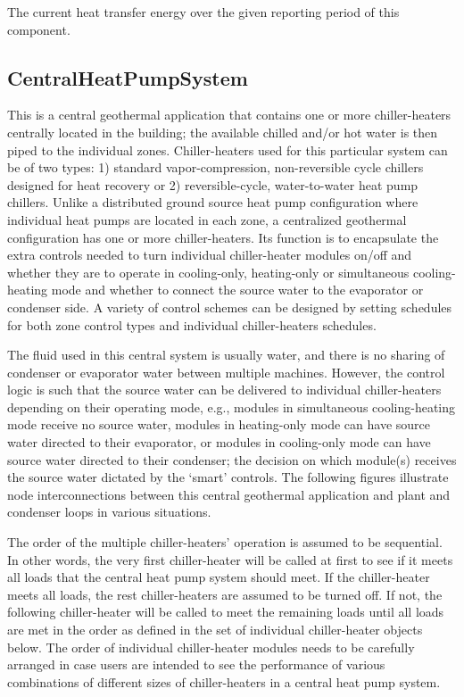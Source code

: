 The current heat transfer energy over the given reporting period of this component.

\subsection{CentralHeatPumpSystem}\label{centralheatpumpsystem}

This is a central geothermal application that contains one or more chiller-heaters centrally located in the building; the available chilled and/or hot water is then piped to the individual zones. Chiller-heaters used for this particular system can be of two types: 1) standard vapor-compression, non-reversible cycle chillers designed for heat recovery or 2) reversible-cycle, water-to-water heat pump chillers. Unlike a distributed ground source heat pump configuration where individual heat pumps are located in each zone, a centralized geothermal configuration has one or more chiller-heaters. Its function is to encapsulate the extra controls needed to turn individual chiller-heater modules on/off and whether they are to operate in cooling-only, heating-only or simultaneous cooling-heating mode and whether to connect the source water to the evaporator or condenser side. A variety of control schemes can be designed by setting schedules for both zone control types and individual chiller-heaters schedules.

The fluid used in this central system is usually water, and there is no sharing of condenser or evaporator water between multiple machines. However, the control logic is such that the source water can be delivered to individual chiller-heaters depending on their operating mode, e.g., modules in simultaneous cooling-heating mode receive no source water, modules in heating-only mode can have source water directed to their evaporator, or modules in cooling-only mode can have source water directed to their condenser; the decision on which module(s) receives the source water dictated by the `smart' controls. The following figures illustrate node interconnections between this central geothermal application and plant and condenser loops in various situations.

The order of the multiple chiller-heaters' operation is assumed to be sequential. In other words, the very first chiller-heater will be called at first to see if it meets all loads that the central heat pump system should meet. If the chiller-heater meets all loads, the rest chiller-heaters are assumed to be turned off. If not, the following chiller-heater will be called to meet the remaining loads until all loads are met in the order as defined in the set of individual chiller-heater objects below. The order of individual chiller-heater modules needs to be carefully arranged in case users are intended to see the performance of various combinations of different sizes of chiller-heaters in a central heat pump system.

